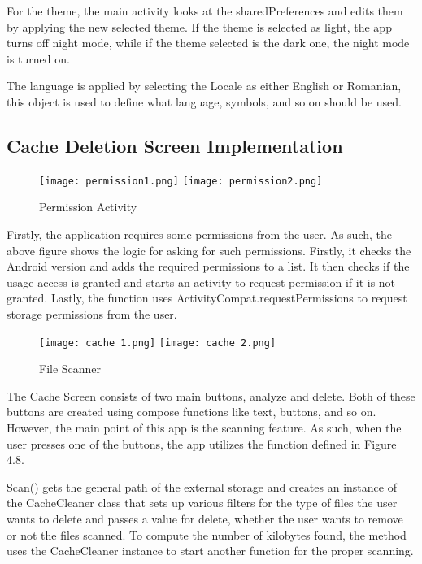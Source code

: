 For the theme, the main activity looks at the sharedPreferences and edits them by applying the new selected theme. If the theme is selected as light, the app turns off night mode, while if the theme selected is the dark one, the night mode is turned on.

The language is applied by selecting the Locale as either English or Romanian, this object is used to define what language, symbols, and so on should be used.

\newpage

\subsection{Cache Deletion Screen Implementation}\label{subsect:Cache Deletion Screen Implementation}

\begin{figure}[htp]
    \centering
    \texttt{[image: permission1.png]}
    \texttt{[image: permission2.png]}
    \caption{Permission Activity}
    \label{fig: Permission Activity}
\end{figure}

Firstly, the application requires some permissions from the user. As such, the above figure shows the logic for asking for such permissions. Firstly, it checks the Android version and adds the required permissions to a list. It then checks if the usage access is granted and starts an activity to request permission if it is not granted. Lastly, the function uses ActivityCompat.requestPermissions to request storage permissions from the user.

\newpage

\begin{figure}[htp]
    \centering
    \texttt{[image: cache 1.png]}
    \texttt{[image: cache 2.png]}
    \caption{File Scanner}
    \label{fig: File Scanner}
\end{figure}

The Cache Screen consists of two main buttons, analyze and delete. Both of these buttons are created using compose functions like text, buttons, and so on. However, the main point of this app is the scanning feature. As such, when the user presses one of the buttons, the app utilizes the function defined in Figure 4.8. 

Scan() gets the general path of the external storage and creates an instance of the CacheCleaner class that sets up various filters for the type of files the user wants to delete and passes a value for delete, whether the user wants to remove or not the files scanned. To compute the number of kilobytes found, the method uses the CacheCleaner instance to start another function for the proper scanning.

